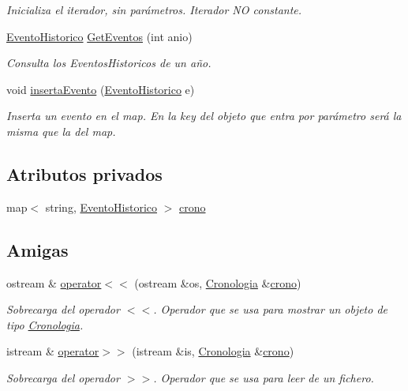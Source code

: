\begin{DoxyCompactItemize}
\begin{DoxyCompactList}\small\item\em Inicializa el iterador, sin parámetros. Iterador NO constante. \end{DoxyCompactList}\item 
\hyperlink{classEventoHistorico}{Evento\+Historico} \hyperlink{classCronologia_aacd012b3596122f028da5552c0cc9f39}{Get\+Eventos} (int anio)
\begin{DoxyCompactList}\small\item\em Consulta los Eventos\+Historicos de un año. \end{DoxyCompactList}\item 
void \hyperlink{classCronologia_a006c5d809c17d50d255bb5b6456a4776}{inserta\+Evento} (\hyperlink{classEventoHistorico}{Evento\+Historico} e)
\begin{DoxyCompactList}\small\item\em Inserta un evento en el map. En la key del objeto que entra por parámetro será la misma que la del map. \end{DoxyCompactList}\end{DoxyCompactItemize}
\subsection*{Atributos privados}
\begin{DoxyCompactItemize}
\item 
map$<$ string, \hyperlink{classEventoHistorico}{Evento\+Historico} $>$ \hyperlink{classCronologia_a5ba99beab3de21fd9c1c4c3555839d76}{crono}
\end{DoxyCompactItemize}
\subsection*{Amigas}
\begin{DoxyCompactItemize}
\item 
ostream \& \hyperlink{classCronologia_a17fd606eac01e5f072ee997137115668}{operator$<$$<$} (ostream \&os, \hyperlink{classCronologia}{Cronologia} \&\hyperlink{classCronologia_a5ba99beab3de21fd9c1c4c3555839d76}{crono})
\begin{DoxyCompactList}\small\item\em Sobrecarga del operador $<$$<$. Operador que se usa para mostrar un objeto de tipo \hyperlink{classCronologia}{Cronologia}. \end{DoxyCompactList}\item 
istream \& \hyperlink{classCronologia_a32b7d5d955c9ddc781947fca308fa32e}{operator$>$$>$} (istream \&is, \hyperlink{classCronologia}{Cronologia} \&\hyperlink{classCronologia_a5ba99beab3de21fd9c1c4c3555839d76}{crono})
\begin{DoxyCompactList}\small\item\em Sobrecarga del operador $>$$>$. Operador que se usa para leer de un fichero. \end{DoxyCompactList}\end{DoxyCompactItemize}


